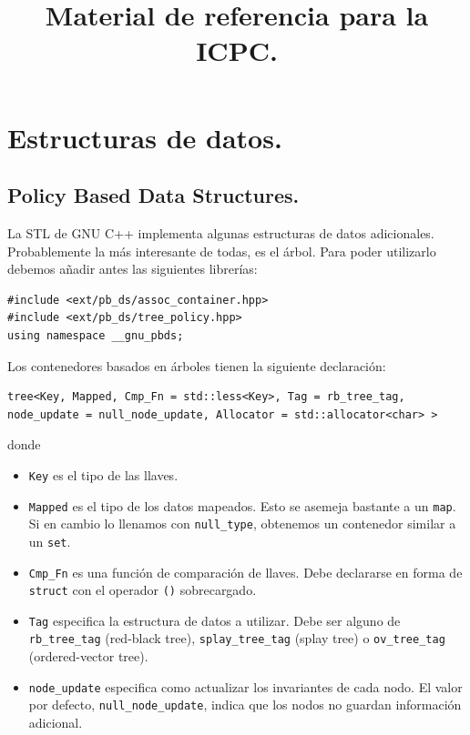 \documentclass[12pt, letterpaper, twoside]{article}
\title{Material de referencia para la ICPC.}
\author{}
\date{}
\begin{document}
\maketitle

\tableofcontents

\newpage

\section{Estructuras de datos.}

\subsection{Policy Based Data Structures.}

La STL de GNU C++ implementa algunas estructuras de datos adicionales. Probablemente la más interesante de todas, es el árbol. Para poder utilizarlo debemos añadir antes las siguientes librerías:

\begin{lstlisting}
#include <ext/pb_ds/assoc_container.hpp>
#include <ext/pb_ds/tree_policy.hpp>
using namespace __gnu_pbds;
\end{lstlisting}

Los contenedores basados en árboles tienen la siguiente declaración:

\begin{lstlisting}
tree<Key, Mapped, Cmp_Fn = std::less<Key>, Tag = rb_tree_tag, node_update = null_node_update, Allocator = std::allocator<char> >
\end{lstlisting}

donde
\begin{itemize}
\item \texttt{Key} es el tipo de las llaves.

\item \texttt{Mapped} es el tipo de los datos mapeados. Esto se asemeja bastante a un \texttt{map}. Si en cambio lo llenamos con \texttt{null\_type}, obtenemos un contenedor similar a un \texttt{set}.

\item \texttt{Cmp\_Fn} es una función de comparación de llaves. Debe declararse en forma de \texttt{struct} con el operador \texttt{()} sobrecargado.

\item \texttt{Tag} especifica la estructura de datos a utilizar. Debe ser alguno de \texttt{rb\_tree\_tag} (red-black tree), \texttt{splay\_tree\_tag} (splay tree) o \texttt{ov\_tree\_tag} (ordered-vector tree).

\item \texttt{node\_update} especifica como actualizar los invariantes de cada nodo. El valor por defecto, \texttt{null\_node\_update}, indica que los nodos no guardan información adicional.
\end{itemize}
\end{document}
